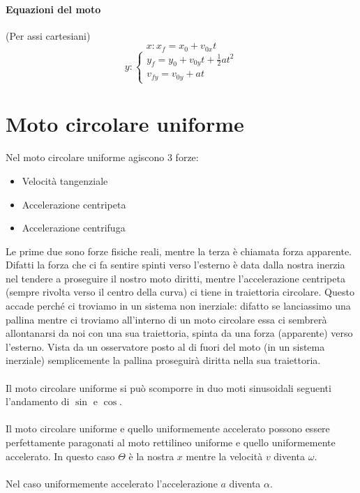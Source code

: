         \paragraph{Equazioni del moto}
        (Per assi cartesiani)
        \begin{equation}
            x: x_f = x_0 + v_{0x}t
        \end{equation}
        \begin{equation}
            y: \begin{cases}
                y_f = y_0 + v_{0y}t + \frac{1}{2}at^2 \\
                v_{fy} = v_{0y} + at
                \end{cases}
        \end{equation}

    \section{Moto circolare uniforme}
        Nel moto circolare uniforme agiscono 3 forze:
        \begin{itemize}
            \item Velocità tangenziale
            \item Accelerazione centripeta
            \item Accelerazione centrifuga
        \end{itemize}
        Le prime due sono forze fisiche reali, mentre la terza è chiamata forza
        apparente. Difatti la forza che ci fa sentire spinti verso l'esterno è
        data dalla nostra inerzia nel tendere a proseguire il nostro moto 
        diritti, mentre l'accelerazione centripeta (sempre rivolta verso il
        centro della curva) ci tiene in traiettoria circolare. Questo accade
        perché ci troviamo in un sistema non inerziale: difatto se lanciassimo 
        una pallina mentre ci troviamo all'interno di un moto circolare essa ci
        sembrerà allontanarsi da noi con una sua traiettoria, spinta da una 
        forza (apparente) verso l'esterno. Vista da un osservatore posto al di
        fuori del moto (in un sistema inerziale) semplicemente la pallina 
        proseguirà diritta nella sua traiettoria.\\\\
        Il moto circolare uniforme si può scomporre in duo moti sinusoidali 
        seguenti l'andamento di $\sin$ e $\cos$.\\\\
        Il moto circolare uniforme e quello uniformemente accelerato possono 
        essere perfettamente paragonati al moto rettilineo uniforme e quello 
        uniformemente accelerato. In questo caso $\Theta$ è la nostra $x$ mentre
        la velocità $v$ diventa $\omega$.\\\\
        Nel caso uniformemente accelerato l'accelerazione $a$ diventa $\alpha$.

